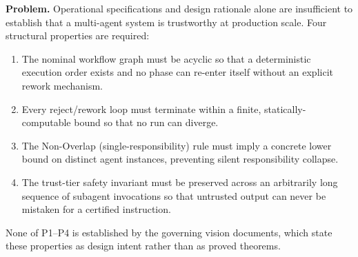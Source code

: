 \documentclass[12pt]{article}
\theoremstyle{definition}
\begin{document}
\medskip
\noindent
\textbf{Problem.}
Operational specifications and design rationale alone are
insufficient to establish that a multi-agent system is trustworthy at
production scale.
Four structural properties are required:
\begin{enumerate}
    \item[(P1)] The nominal workflow graph must be acyclic so that a
          deterministic execution order exists and no phase can
          re-enter itself without an explicit rework mechanism.
    \item[(P2)] Every reject/rework loop must terminate within a
          finite, statically-computable bound so that no run can
          diverge.
    \item[(P3)] The Non-Overlap (single-responsibility) rule must
          imply a concrete lower bound on distinct agent instances,
          preventing silent responsibility collapse.
    \item[(P4)] The trust-tier safety invariant must be preserved
          across an arbitrarily long sequence of subagent invocations
          so that untrusted output can never be mistaken for a
          certified instruction.
\end{enumerate}
None of P1--P4 is established by the governing vision documents,
which state these properties as design intent rather than as proved
theorems.
\end{document}
